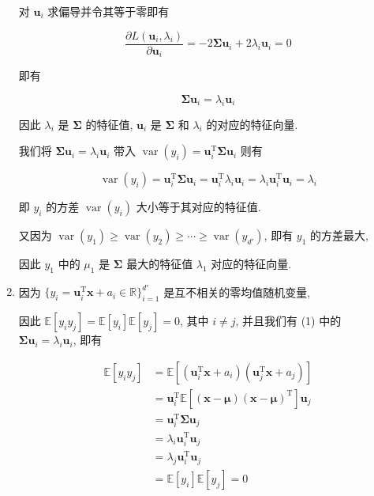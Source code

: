 \documentclass[answers]{exam}  %
\begin{document}
\begin{questions}
\begin{solution}
\begin{enumerate}
            对 $\bm{u}_i$ 求偏导并令其等于零即有

            $$
              \frac{\partial L(\bm{u}_i, \lambda_i)}{\partial \bm{u}_i} = -2\bm{\Sigma} \bm{u}_i + 2\lambda_i \bm{u}_i = 0
            $$

            即有

            $$
              \bm{\Sigma} \bm{u}_i = \lambda_i \bm{u}_i
            $$

            因此 $\lambda_i$ 是 $\bm{\Sigma}$ 的特征值, $\bm{u}_i$ 是 $\bm{\Sigma}$ 和 $\lambda_i$ 的对应的特征向量.

            我们将 $\bm{\Sigma} \bm{u}_i = \lambda_i \bm{u}_i$ 带入 $\operatorname{var}(y_i) = \bm{u}_i^{\mathrm{T}}\bm{\Sigma}\bm{u}_i$ 则有

            $$
              \operatorname{var}(y_i) = \bm{u}_i^{\mathrm{T}}\bm{\Sigma}\bm{u}_i = \bm{u}_i^{\mathrm{T}}\lambda_i\bm{u}_i = \lambda_i\bm{u}_i^{\mathrm{T}}\bm{u}_i = \lambda_i
            $$

            即 $y_i$ 的方差 $\operatorname{var}(y_i)$ 大小等于其对应的特征值.

            又因为 $\operatorname{var}(y_1) \ge \operatorname{var}(y_2) \ge \cdots \ge \operatorname{var}(y_{d'})$, 即有 $y_1$ 的方差最大,

            因此 $y_1$ 中的 $\mu_1$ 是 $\bm{\Sigma}$ 最大的特征值 $\lambda_1$ 对应的特征向量.

      \item

            因为 $\{ y_i = \bm{u}_i^{\mathrm{T}}\bm{x} + a_i \in \mathbb{R} \}_{i=1}^{d'}$ 是互不相关的零均值随机变量,

            因此 $\mathbb{E}[y_i y_j] = \mathbb{E}[y_i]\mathbb{E}[y_j] = 0$, 其中 $i \neq j$, 并且我们有 (1) 中的 $\bm{\Sigma} \bm{u}_i = \lambda_i \bm{u}_i$, 即有

            $$
              \begin{aligned}
                \mathbb{E}[y_i y_j]
                 & = \mathbb{E}[(\bm{u}_i^{\mathrm{T}}\bm{x} + a_i)(\bm{u}_j^{\mathrm{T}}\bm{x} + a_j)]           \\
                 & = \bm{u}_i^{\mathrm{T}}\mathbb{E}[(\bm{x} - \bm{\mu})(\bm{x} - \bm{\mu})^{\mathrm{T}}]\bm{u}_j \\
                 & = \bm{u}_i^{\mathrm{T}}\bm{\Sigma}\bm{u}_j                                                     \\
                 & = \lambda_i\bm{u}_i^{\mathrm{T}}\bm{u}_j                                                       \\
                 & = \lambda_j\bm{u}_i^{\mathrm{T}}\bm{u}_j                                                       \\
                 & = \mathbb{E}[y_i]\mathbb{E}[y_j]  = 0                                                          \\
              \end{aligned}
            $$


\end{enumerate}
\end{solution}
\end{questions}
\end{document}
